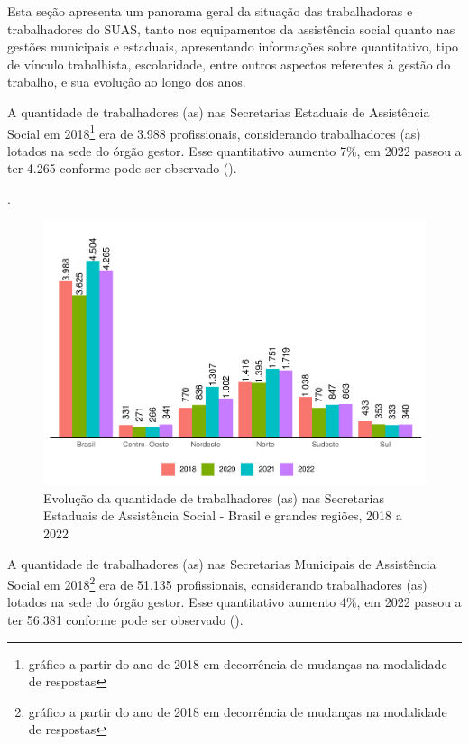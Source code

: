 \documentclass[
  brazilian]{report}
\begin{document}
Esta seção apresenta um panorama geral da situação das trabalhadoras e
trabalhadores do SUAS, tanto nos equipamentos da assistência social
quanto nas gestões municipais e estaduais, apresentando informações
sobre quantitativo, tipo de vínculo trabalhista, escolaridade, entre
outros aspectos referentes à gestão do trabalho, e sua evolução ao longo
dos anos.

A quantidade de trabalhadores (as) nas Secretarias Estaduais de
Assistência Social em
2018\footnote{gráfico a partir do ano de 2018 em decorrência de mudanças na modalidade de respostas}
era de 3.988 profissionais, considerando trabalhadores (as) lotados na
sede do órgão gestor. Esse quantitativo aumento 7\%, em 2022 passou a
ter 4.265 conforme pode ser observado ().

.

\begin{figure}
\includegraphics{Censo-SUAS-2022_files/figure-latex/qtd-trab-uf-1} \caption[Evolução da quantidade de trabalhadores (as) nas Secretarias Estaduais de Assistência Social - Brasil e grandes regiões, 2018 a 2022]{Evolução da quantidade de trabalhadores (as) nas Secretarias Estaduais de Assistência Social - Brasil e grandes regiões, 2018 a 2022}\label{fig:qtd-trab-uf}
\end{figure}

A quantidade de trabalhadores (as) nas Secretarias Municipais de
Assistência Social em
2018\footnote{gráfico a partir do ano de 2018 em decorrência de mudanças na modalidade de respostas}
era de 51.135 profissionais, considerando trabalhadores (as) lotados na
sede do órgão gestor. Esse quantitativo aumento 4\%, em 2022 passou a
ter 56.381 conforme pode ser observado ().
\end{document}
